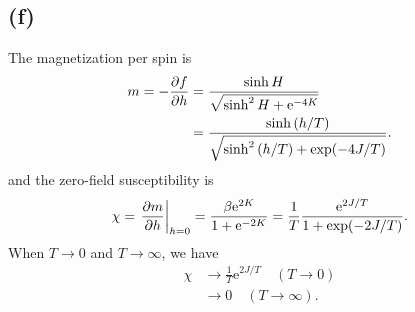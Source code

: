 \documentclass{article}
\newcommand{\me}{\mathrm{e}}
\begin{document}
\subsection*{(f)}
The magnetization per spin is 
\begin{equation}
    \begin{split}
        m=-\pdv{f}{h}&=\frac{\sinh{H}}{\sqrt{\sinh^2{H}+\me^{-4K}}}\\
                    &=\frac{\sinh{(h/T)}}{\sqrt{\sinh^2{(h/T)}+\exp(-4J/T)}}.
    \end{split}
\end{equation}
and the zero-field susceptibility is
\begin{equation}
    \chi=\eval{\pdv{m}{h}}_{h=0}=\frac{\beta \me^{2K}}{1+\me^{-2K}}=\frac{1}{T}\frac{\me^{2J/T}}{1+\exp(-2J/T)}.
\end{equation}
When $T\to 0$ and $T\to\infty$, we have 
\begin{equation}
    \begin{split}
        \chi&\to \frac{1}{T}\me^{2J/T} \quad (T\to 0)\\
            &\to 0 \quad (T\to\infty).
    \end{split}
\end{equation}

%
%
\end{document}
